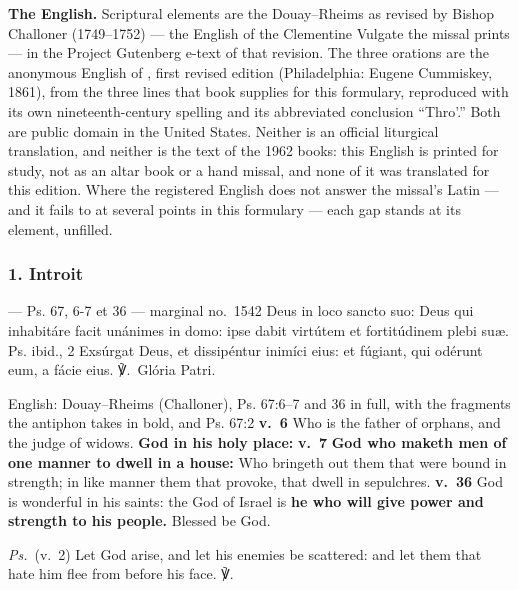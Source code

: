 \textbf{The English.} Scriptural elements are the Douay--Rheims as revised by
Bishop Challoner (1749--1752) --- the English of the Clementine Vulgate the
missal prints --- in the Project Gutenberg e-text of that revision. The three
orations are the anonymous English of , first revised edition
(Philadelphia: Eugene Cummiskey, 1861), from the three lines that book
supplies for this formulary, reproduced with its own nineteenth-century
spelling and its abbreviated conclusion ``Thro'.'' Both are public domain in
the United States. Neither is an official liturgical translation, and neither
is the text of the 1962 books: this English is printed for study, not as an
altar book or a hand missal, and none of it was translated for this edition.
Where the registered English does not answer the missal's Latin --- and it
fails to at several points in this formulary --- each gap stands at its
element, unfilled.

\elementguard
\subsubsection*{1. Introit }

\begin{appointedlatin}{ --- Ps. 67, 6-7 et 36 --- marginal no.\ 1542}
Deus in loco sancto suo: Deus qui inhabitáre facit unánimes in domo: ipse
dabit virtútem et fortitúdinem plebi suæ. \textnormal{Ps. ibid., 2} Exsúrgat
Deus, et dissipéntur inimíci eius: et fúgiant, qui odérunt eum, a fácie eius.
℣.~Glória Patri.
\end{appointedlatin}

\begin{namedtranslation}{English: Douay--Rheims (Challoner), Ps. 67:6--7 and 36 in full, with the fragments the antiphon takes in bold, and Ps. 67:2}
\textbf{v.~6} Who is the father of orphans, and the judge of widows.
\textbf{God in his holy place:} \textbf{v.~7} \textbf{God who maketh men of
one manner to dwell in a house:} Who bringeth out them that were bound in
strength; in like manner them that provoke, that dwell in sepulchres.
\textbf{v.~36} God is wonderful in his saints: the God of Israel is
\textbf{he who will give power and strength to his people.} Blessed be God.

\textit{Ps.}~(v.~2) Let God arise, and let his enemies be scattered: and let
them that hate him flee from before his face. ℣.~
\end{namedtranslation}

